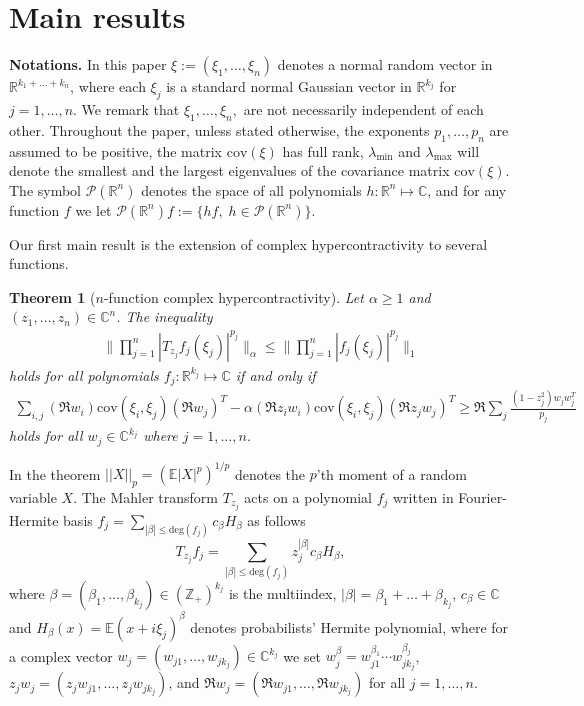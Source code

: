 \documentclass[9pt, a4paper]{amsart}
\newcommand{\C}{\mathbb{C}}
\newcommand{\1}{{\chi_{}}}%
\newtheorem{theorem}{Theorem}
\numberwithin{equation}{section}
\begin{document}
\section{Main results}
\noindent
\textbf{Notations.} In this paper $\xi := (\xi_{1}, \ldots, \xi_{n})$ denotes a normal random vector in $\mathbb{R}^{k_{1}+\ldots+k_{n}}$, where each $\xi_{j}$ is a standard normal Gaussian vector in $\mathbb{R}^{k_{j}}$ for $j = 1, \ldots, n$. We remark that $\xi_{1}, \ldots, \xi_{n},$ are not necessarily independent of each other.  Throughout the paper, unless stated otherwise, the exponents $p_{1}, \ldots, p_{n}$ are assumed to be positive, the matrix $\mathrm{cov}(\xi)$ has full rank, $\lambda_{\min}$ and $\lambda_{\max}$ will denote the smallest and the largest eigenvalues of the covariance matrix $\mathrm{cov}(\xi)$. The symbol $\mathcal{P}(\mathbb{R}^{n})$ denotes the space of all polynomials $h : \mathbb{R}^{n} \mapsto \mathbb{C}$, and for any function $f$ we let $\mathcal{P}(\mathbb{R}^{n})f := \{ hf,  \;   h \in \mathcal{P}(\mathbb{R}^{n})\}$. 

\vskip1cm 


Our first main result is the extension of complex hypercontractivity to several functions. 
\begin{theorem}[$n$-function complex hypercontractivity]\label{MCH}
Let $\alpha\geq 1$ and $(z_{1}, \ldots, z_{n}) \in \mathbb{C}^{n}$. The inequality 
 \begin{align}\label{multipulti}
 \| \prod_{j=1}^{n} |T_{z_{j}}f_{j}(\xi_{j})|^{p_{j}}\|_{\alpha} \leq \|  \prod_{j=1}^{n} |f_{j}(\xi_{j})|^{p_{j}}\|_{1}
 \end{align}
 holds for all polynomials $f_{j} : \mathbb{R}^{k_{j}} \mapsto \mathbb{C}$ if and only if
\begin{align}\label{localcc}
\sum_{i,j}(\Re w_{i})\mathrm{cov}(\xi_{i}, \xi_{j}) (\Re w_{j})^{T} - \alpha (\Re z_{i}w_{i}) \mathrm{cov}(\xi_{i}, \xi_{j}) (\Re z_{j}w_{j})^{T} \geq \Re \sum_{j} \frac{(1-z_{j}^{2}) w_{j} w_{j}^{T}}{p_{j}}
\end{align}
holds for all $w_{j} \in \mathbb{C}^{k_{j}}$ where $j=1, \ldots, n$.
\end{theorem}
In the theorem $||X||_{p} = (\mathbb{E} |X|^{p})^{1/p}$ denotes the $p$'th moment of a random variable $X$. The Mahler transform $T_{z_{j}}$ acts on a polynomial $f_{j}$ written in Fourier-Hermite basis $f_{j} =\sum_{|\beta|\leq \mathrm{deg}(f_j)}c_{\beta} H_{\beta}$ as follows
$$
T_{z_{j}}f_{j} = \sum_{|\beta|\leq \mathrm{deg}(f_{j})}z_{j}^{|\beta|}c_{\beta} H_{\beta},
$$
where $\beta = (\beta_{1}, \ldots, \beta_{k_{j}}) \in (\mathbb{Z}_{+})^{k_{j}}$ is the multiindex, $|\beta| = \beta_{1}+\ldots+\beta_{k_{j}}$, $c_{\beta}\in \C$ and $H_{\beta}(x) = \mathbb{E}(x+i \xi_{j})^{\beta}$ denotes probabilists' Hermite polynomial, where for a complex vector $w_{j}=(w_{j1}, \ldots, w_{jk_{j}}) \in \mathbb{C}^{k_{j}}$ we set $w_{j}^{\beta} = w_{j1}^{\beta_{1}}\cdots w_{jk_{j}}^{\beta_{j}}$, $z_{j} w_{j} = (z_{j} w_{j1}, \ldots, z_{j} w_{jk_{j}})$, and $\Re w_{j} = (\Re w_{j1}, \ldots, \Re w_{jk_{j}})$ for all $j=1, \ldots, n$. 
\end{document}
